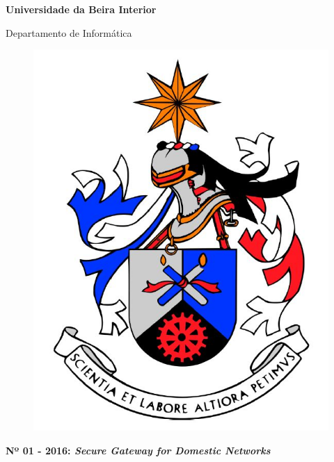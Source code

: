 
\thispagestyle{empty}
\setcounter{page}{-1}

\begin{center}
\begin{Huge}
\textbf{Universidade da Beira Interior}
\end{Huge}
\end{center}

\begin{center}
\begin{Huge}
Departamento de Informática
\end{Huge}
\end{center}

\vspace{0,07cm}
\begin{figure}[!htb]
\centering
\includegraphics[scale=0.3]{brasaoubi.JPG}
\end{figure}

\vspace{0.5cm}
\begin{center}
\begin{Large}
\textbf{Nº 01 - 2016: \emph{Secure Gateway for Domestic Networks}}
\end{Large}
\end{center}


